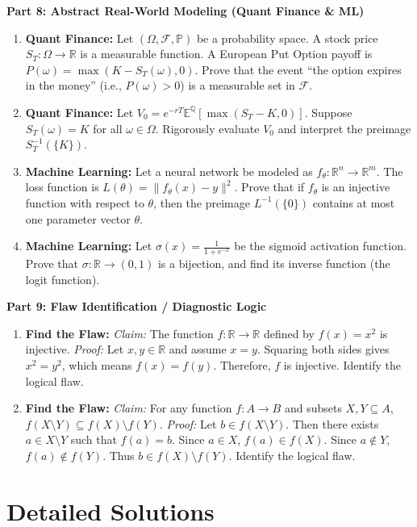 \documentclass[11pt, letterpaper]{article}
\theoremstyle{definition}
\theoremstyle{remark}
\newcommand{\R}{\mathbb{R}}
\newcommand{\Q}{\mathbb{Q}}
\newcommand{\E}{\mathbb{E}}
\newcommand{\Prob}{\mathbb{P}}
\newcommand{\F}{\mathcal{F}}
\begin{document}
\textbf{Part 8: Abstract Real-World Modeling (Quant Finance \& ML)}
\begin{enumerate}[label=\textbf{\arabic*.}, resume]
    \item \textbf{Quant Finance:} Let $(\Omega, \F, \Prob)$ be a probability space. A stock price $S_T: \Omega \to \R$ is a measurable function. A European Put Option payoff is $P(\omega) = \max(K - S_T(\omega), 0)$. Prove that the event ``the option expires in the money'' (i.e., $P(\omega) > 0$) is a measurable set in $\F$.
    \item \textbf{Quant Finance:} Let $V_0 = e^{-rT} \E^\Q[\max(S_T - K, 0)]$. Suppose $S_T(\omega) = K$ for all $\omega \in \Omega$. Rigorously evaluate $V_0$ and interpret the preimage $S_T^{-1}(\{K\})$.
    \item \textbf{Machine Learning:} Let a neural network be modeled as $f_\theta: \R^n \to \R^m$. The loss function is $L(\theta) = \|f_\theta(x) - y\|^2$. Prove that if $f_\theta$ is an injective function with respect to $\theta$, then the preimage $L^{-1}(\{0\})$ contains at most one parameter vector $\theta$.
    \item \textbf{Machine Learning:} Let $\sigma(x) = \frac{1}{1 + e^{-x}}$ be the sigmoid activation function. Prove that $\sigma: \R \to (0, 1)$ is a bijection, and find its inverse function (the logit function).
\end{enumerate}

\textbf{Part 9: Flaw Identification / Diagnostic Logic}
\begin{enumerate}[label=\textbf{\arabic*.}, resume]
    \item \textbf{Find the Flaw:} \textit{Claim:} The function $f: \R \to \R$ defined by $f(x) = x^2$ is injective. \textit{Proof:} Let $x, y \in \R$ and assume $x = y$. Squaring both sides gives $x^2 = y^2$, which means $f(x) = f(y)$. Therefore, $f$ is injective. Identify the logical flaw.
    \item \textbf{Find the Flaw:} \textit{Claim:} For any function $f: A \to B$ and subsets $X, Y \subseteq A$, $f(X \setminus Y) \subseteq f(X) \setminus f(Y)$. \textit{Proof:} Let $b \in f(X \setminus Y)$. Then there exists $a \in X \setminus Y$ such that $f(a) = b$. Since $a \in X$, $f(a) \in f(X)$. Since $a \notin Y$, $f(a) \notin f(Y)$. Thus $b \in f(X) \setminus f(Y)$. Identify the logical flaw.
\end{enumerate}

\newpage

\section{Detailed Solutions}
\end{document}
